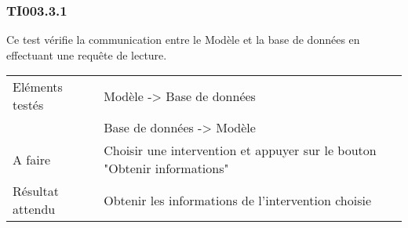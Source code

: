 
\subsubsection{TI003.3.1}
  		Ce test vérifie la communication entre le Modèle et la base de données en effectuant une requête de lecture.
  		\begin{center}
    	 		\begin{tabular}[h]{|p{}|p{}|}
			\hline
				Eléments testés & Modèle -> Base de données  \\
							    &  Base de données -> Modèle \\\hline
    				A faire & Choisir une intervention et appuyer sur le bouton "Obtenir informations" \\\hline
    				Résultat attendu & Obtenir les informations de l'intervention choisie \\\hline
     		\end{tabular}
  		\end{center}	